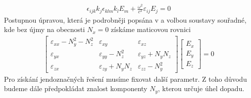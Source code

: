 \begin{eqnarray}
\epsilon_{ijk}k_j\epsilon_{klm}k_lE_m+\frac{\omega^2}{c^2}\varepsilon_{ij}E_j =0
\end{eqnarray}
Postupnou úpravou, která je podrobněji popsána v \cite{Nyvlt} a volbou soustavy souřadné, kde bez újmy na obecnosti $N_x=0$ získáme maticovou rovnici
\begin{eqnarray}
\begin{bmatrix}
\varepsilon_{xx}-N_y^2-N_z^2& \varepsilon_{xy}& \varepsilon_{xz} \\
\varepsilon_{yx}&   \varepsilon_{yy}-N_z^2& \varepsilon_{yz}+N_yN_z\\
\varepsilon_{zx}&   \varepsilon_{zy}+N_yN_z& \varepsilon_{zz}-N_y^2
\end{bmatrix}
\begin{bmatrix}
E_x\\ E_y\\ E_z
\end{bmatrix} = 0
\label{Matic1}
\end{eqnarray}
Pro získání jendoznačných řešení musíme fixovat další parametr. Z toho důvodu budeme dále předpokládat znalost komponenty $N_y$, kterou určuje úhel dopadu.

